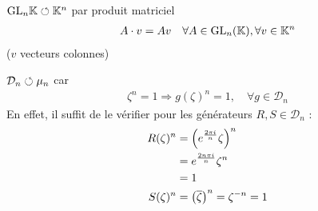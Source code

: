 \documentclass[french,a4paper,10pt]{article}
\begin{document}
	\begin{example}
		$\text{GL}_{n}{\mathbb{K}}\circlearrowleft\mathbb{K}^n$ par produit matriciel
		\[\begin{aligned}
			A\cdot v=Av\quad\forall A\in \text{GL}_{n}(\mathbb{K}),\forall v\in \mathbb{K}^n
		\end{aligned}\]
		($v$ vecteurs colonnes)
	\end{example}
	
	\begin{example}
		$\mathcal D_n\circlearrowleft\mu_n$ car
		\[\begin{aligned}
			\zeta^n=1\Longrightarrow g(\zeta)^n=1,\quad\forall g\in\mathcal D_n
		\end{aligned}\]
		En effet, il suffit de le vérifier pour les générateurs $R, S\in \mathcal D_n$ :
		\[\begin{aligned}
			R(\zeta)^n&=\left(e^{\frac{2\pi i}n}\zeta\right)^n\\
			&=e^{\frac{2n\pi i}n}\zeta^n\\&=1\\
			S(\zeta)^n&=\left(\overline{\zeta}\right)^n=\zeta^{-n}=1
		\end{aligned}\]
	\end{example}
	
\end{document}
